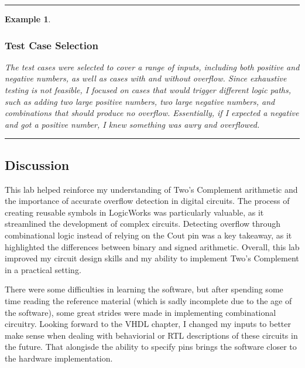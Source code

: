 \documentclass[12pt]{article}
\newtheorem{example}{Example}
\newenvironment{examp}
{\vspace{0.5cm}
\hrule
\begin{example}}
{\hrule
\vspace{0.5cm}
\end{example}}
\begin{document}
\begin{examp}
	\subsubsection*{Test Case Selection}
	\textnormal{
		The test cases were selected to cover a range of inputs, including both positive and negative numbers, as well as cases with and without overflow. Since exhaustive testing is not feasible, I focused on cases that would trigger different logic paths, such as adding two large positive numbers, two large negative numbers, and combinations that should produce no overflow. Essentially, if I expected a negative and got a positive number, I knew something was awry and overflowed.}\newline
\end{examp}
\subsection*{Discussion}
This lab helped reinforce my understanding of Two’s Complement arithmetic and the importance of accurate overflow detection in digital circuits. The process of creating reusable symbols in LogicWorks was particularly valuable, as it streamlined the development of complex circuits. Detecting overflow through combinational logic instead of relying on the Cout pin was a key takeaway, as it highlighted the differences between binary and signed arithmetic. Overall, this lab improved my circuit design skills and my ability to implement Two’s Complement in a practical setting.

There were some difficulties in learning the software, but after spending some time reading the reference material (which is sadly incomplete due to the age of the software), some great strides were made in implementing combinational circuitry. Looking forward to the VHDL chapter, I changed my inputs to better make sense when dealing with behaviorial or RTL descriptions of these circuits in the future. That alongisde the ability to specify pins brings the software closer to the hardware implementation.
\end{document}
